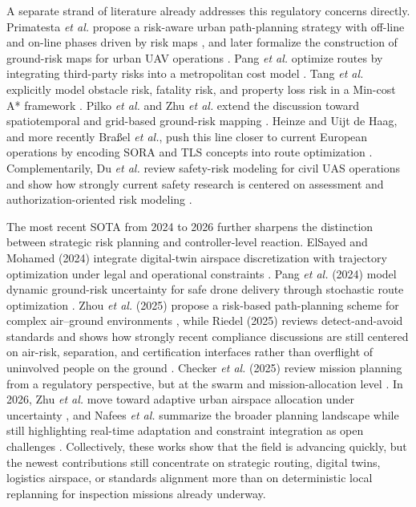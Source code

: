 \documentclass[a4paper,11pt]{article}
\begin{document}
 
A separate strand of literature already addresses this regulatory concerns directly. Primatesta \emph{et al.} propose a risk-aware urban path-planning strategy with off-line and on-line phases driven by risk maps \cite{primatesta2019riskaware}, and later formalize the construction of ground-risk maps for urban UAV operations \cite{primatesta2020groundrisk}. Pang \emph{et al.} optimize routes by integrating third-party risks into a metropolitan cost model \cite{pang2022integrated}. Tang \emph{et al.} explicitly model obstacle risk, fatality risk, and property loss risk in a Min-cost A* framework \cite{tang2023thirdparty}. Pilko \emph{et al.} and Zhu \emph{et al.} extend the discussion toward spatiotemporal and grid-based ground-risk mapping \cite{pilko2023spatiotemporal,zhang2023groundrisk}. Heinze and Uijt de Haag, and more recently Bra{\ss}el \emph{et al.}, push this line closer to current European operations by encoding SORA and TLS concepts into route optimization \cite{heinze2023sora,brassel2025riskaware}. Complementarily, Du \emph{et al.} review safety-risk modeling for civil UAS operations and show how strongly current safety research is centered on assessment and authorization-oriented risk modeling \cite{du2024safetyrisk}.


The most recent SOTA from 2024 to 2026 further sharpens the distinction between strategic risk planning and controller-level reaction. ElSayed and Mohamed (2024) integrate digital-twin airspace discretization with trajectory optimization under legal and operational constraints \cite{elsayed2024digitaltwin}. Pang \emph{et al.} (2024) model dynamic ground-risk uncertainty for safe drone delivery through stochastic route optimization \cite{pang2024stochastic}. Zhou \emph{et al.} (2025) propose a risk-based path-planning scheme for complex air--ground environments \cite{zhou2025riskbased}, while Riedel (2025) reviews detect-and-avoid standards and shows how strongly recent compliance discussions are still centered on air-risk, separation, and certification interfaces rather than overflight of uninvolved people on the ground \cite{riedel2025daa}. Checker \emph{et al.} (2025) review mission planning from a regulatory perspective, but at the swarm and mission-allocation level \cite{checker2025regulatory}. In 2026, Zhu \emph{et al.} move toward adaptive urban airspace allocation under uncertainty \cite{zhu2026adaptive}, and Nafees \emph{et al.} summarize the broader planning landscape while still highlighting real-time adaptation and constraint integration as open challenges \cite{nafees2026review}. Collectively, these works show that the field is advancing quickly, but the newest contributions still concentrate on strategic routing, digital twins, logistics airspace, or standards alignment more than on deterministic local replanning for inspection missions already underway.
\end{document}
